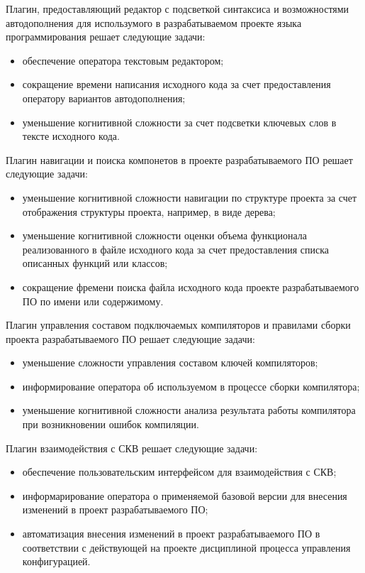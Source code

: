 Плагин, предоставляющий редактор с подсветкой синтаксиса и возможностями автодополнения для использумого в разрабатываемом проекте языка программирования решает следующие задачи:
\begin{itemize}
    \item обеспечение оператора текстовым редактором;
    \item сокращение времени написания исходного кода за счет предоставления оператору вариантов автодополнения;
    \item уменьшение когнитивной сложности за счет подсветки ключевых слов в тексте исходного кода.
\end{itemize}

Плагин навигации и поиска компонетов в проекте разрабатываемого ПО решает следующие задачи:
\begin{itemize}
    \item уменьшение когнитивной сложности навигации по структуре проекта за счет отображения структуры проекта, например, в виде дерева;
    \item уменьшение когнитивной сложности оценки объема функционала реализованного в файле исходного кода за счет предоставления списка описанных функций или классов;
    \item сокращение фремени поиска файла исходного кода проекте разрабатываемого ПО по имени или содержимому.
\end{itemize}

Плагин управления составом подключаемых компиляторов и правилами сборки проекта разрабатываемого ПО решает следующие задачи:
\begin{itemize}
    \item уменьшение сложности управления составом ключей компиляторов;
    \item информирование оператора об используемом в процессе сборки компилятора;
    \item уменьшение когнитивной сложности анализа результата работы компилятора при возникновении ошибок компиляции.
\end{itemize}

Плагин взаимодействия с СКВ решает следующие задачи:
\begin{itemize}
    \item обеспечение пользовательским интерфейсом для взаимодействия с СКВ;
    \item информарирование оператора о применяемой базовой версии для внесения изменений в проект разрабатываемого ПО;
    \item автоматизация внесения изменений в проект разрабатываемого ПО в соответствии с действующей на проекте дисциплиной процесса управления конфигурацией.
\end{itemize}